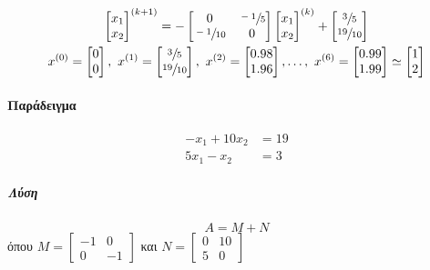 \documentclass[11pt,a4paper,notitlepage,fleqn,final]{article}
\begin{document}
\begin{gather*}
	\left[\begin{matrix}
	x_1\\x_2
	\end{matrix}\right]^{(k+1)} = -\left[\begin{matrix}
	0 & \sfrac{-1}{5} \\ \sfrac{-1}{10} & 0
	\end{matrix}\right] \left[\begin{matrix}
	x_1\\x_2
	\end{matrix}\right]^{(k)} + \left[\begin{matrix}
	\sfrac{3}{5} \\ \sfrac{19}{10}
	\end{matrix}\right] \\
	x^{(0)} = \left[\begin{matrix}
	0\\0
	\end{matrix}\right],\ x^{(1)}=\left[\begin{matrix}
	\sfrac{3}{5} \\ \sfrac{19}{10}
	\end{matrix}\right],\ x^{(2)}=\left[\begin{matrix}
	0.98\\1.96
	\end{matrix}\right],\dots,\ x^{(6)}=\left[\begin{matrix}
	0.99\\1.99
	\end{matrix}\right] \simeq \left[\begin{matrix}
	1 \\ 2
	\end{matrix}\right]
\end{gather*}

\paragraph{Παράδειγμα}
\begin{align*}
	-x_1+10x_2 &= 19 \\
	5x_1-x_2 &= 3
\end{align*}
\subparagraph{Λύση}
\[
A = M + N
\]
όπου \( M = \left[\begin{matrix}
-1&0\\0&-1
\end{matrix}\right] \) και \( N=\left[\begin{matrix}
0&10\\5&0
\end{matrix}\right] \)
\end{document}
